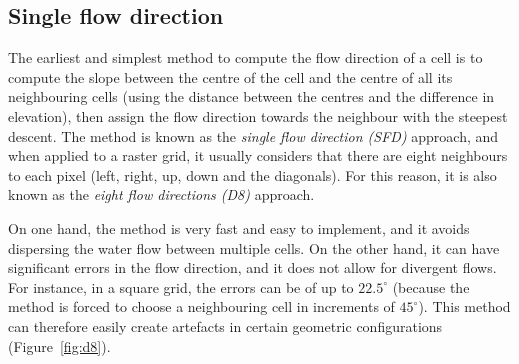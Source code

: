 \subsection{Single flow direction}


The earliest and simplest method to compute the flow direction of a cell is to compute the slope between the centre of the cell and the centre of all its neighbouring cells (using the distance between the centres and the difference in elevation), then assign the flow direction towards the neighbour with the steepest descent.
The method is known as the \emph{single flow direction (SFD)} approach, 
and when applied to a raster grid, it usually considers that there are eight neighbours to each pixel (left, right, up, down and the diagonals).
For this reason, it is also known as the \emph{eight flow directions (D8)} approach.

On one hand, the method is very fast and easy to implement, and it avoids dispersing the water flow between multiple cells.
On the other hand, it can have significant errors in the flow direction, and it does not allow for divergent flows.
For instance, in a square grid, the errors can be of up to \(22.5^\circ{}\) (because the method is forced to choose a neighbouring cell in increments of \(45^\circ{}\)).
This method can therefore easily create artefacts in certain geometric configurations (Figure~\ref{fig:d8}).

